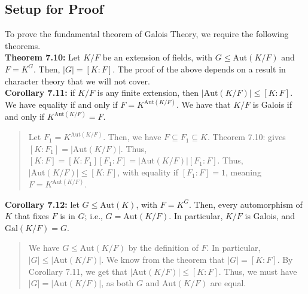 \documentclass[10pt]{extarticle}
\begin{document}
  \subsection{Setup for Proof}%
  To prove the fundamental theorem of Galois Theory, we require the following theorems.\\

  \textbf{Theorem 7.10:} Let $K/F$ be an extension of fields, with $G\leq \text{Aut}(K/F)$ and $F = K^{G}$. Then, $|G| = [K:F]$. The proof of the above depends on a result in character theory that we will not cover.\\
  
  \textbf{Corollary 7.11:} if $K/F$ is any finite extension, then $|\text{Aut}(K/F)| \leq [K:F]$. We have equality if and only if $F = K^{\text{Aut}(K/F)}$. We have that $K/F$ is Galois if and only if $K^{\text{Aut}(K/F)} = F$.
  \begin{quote}
  Let $F_1 = K^{\text{Aut}(K/F)}$. Then, we have $F\subseteq F_1\subseteq K$. Theorem 7.10: gives $[K:F_1] = |\text{Aut}(K/F)|$. Thus, $[K:F] = [K:F_1][F_1:F] = |\text{Aut}(K/F)|[F_1:F]$. Thus, $|\text{Aut}(K/F)| \leq [K:F]$, with equality if $[F_1:F] = 1$, meaning $F = K^{\text{Aut}(K/F)}$.
  \end{quote}

  \textbf{Corollary 7.12:} let $G\leq \text{Aut}(K)$, with $F = K^{G}$. Then, every automorphism of $K$ that fixes $F$ is in $G$; i.e., $G = \text{Aut}(K/F)$. In particular, $K/F$ is Galois, and $\text{Gal}(K/F) = G$.
  \begin{quote}
  We have $G \leq \text{Aut}(K/F)$ by the definition of $F$. In particular, $|G| \leq |\text{Aut}(K/F)|$. We know from the theorem that $|G| = [K:F]$. By Corollary 7.11, we get that $|\text{Aut}(K/F)| \leq [K:F]$. Thus, we must have $|G| = |\text{Aut}(K/F)|$, as both $G$ and $\text{Aut}(K/F)$ are equal.
  \end{quote}
\end{document}
